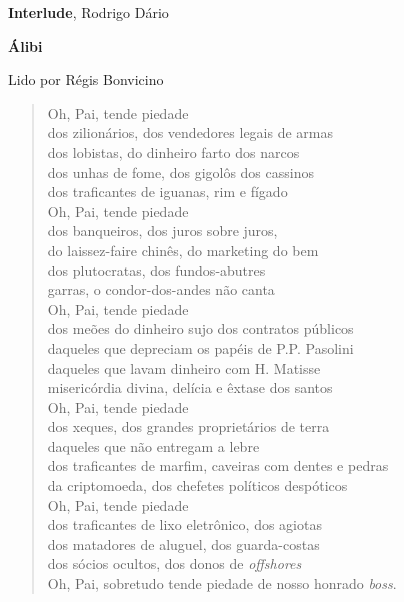 \pagebreak

\textbf{Interlude}, Rodrigo Dário

\pagebreak

\textbf{Álibi}

Lido por Régis Bonvicino

\begin{verse}
Oh, Pai, tende piedade\\
dos zilionários, dos vendedores legais de armas\\
dos lobistas, do dinheiro farto dos narcos\\
dos unhas de fome, dos gigolôs dos cassinos\\
dos traficantes de iguanas, rim e fígado\\[5pt]
Oh, Pai, tende piedade\\
dos banqueiros, dos juros sobre juros,\\
do laissez-faire chinês, do marketing do bem\\
dos plutocratas, dos fundos-abutres\\
garras, o condor-dos-andes não canta\\[5pt]
Oh, Pai, tende piedade\\
dos meões do dinheiro sujo dos contratos públicos\\
daqueles que depreciam os papéis de P.P. Pasolini\\
daqueles que lavam dinheiro com H. Matisse\\
misericórdia divina, delícia e êxtase dos santos\\[5pt]
Oh, Pai, tende piedade\\
dos xeques, dos grandes proprietários de terra\\
daqueles que não entregam a lebre\\
dos traficantes de marfim, caveiras com dentes e pedras\\
da criptomoeda, dos chefetes políticos despóticos\\[5pt]
Oh, Pai, tende piedade\\
dos traficantes de lixo eletrônico, dos agiotas\\
dos matadores de aluguel, dos guarda-costas\\
dos sócios ocultos, dos donos de \emph{offshores}\\
Oh, Pai, sobretudo tende piedade de nosso honrado \emph{boss}.
\end{verse}

